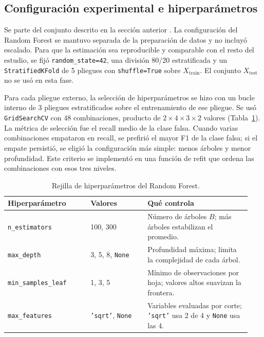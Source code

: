 \documentclass[conference]{IEEEtran}
\begin{document}
    \subsection{Configuración experimental e hiperparámetros}
    \label{sec:rf-metodologia}
    
    Se parte del conjunto descrito en la sección anterior \cite{uci_banknote}. La configuración del Random Forest se mantuvo separada de la preparación de datos y no incluyó escalado. Para que la estimación sea reproducible y comparable con el resto del estudio, se fijó \texttt{random\_state=42}, una división 80/20 estratificada y un \texttt{StratifiedKFold} de 5 pliegues con \texttt{shuffle=True} sobre $X_{\text{train}}$. El conjunto $X_{\text{test}}$ no se usó en esta fase.
    
    Para cada pliegue externo, la selección de hiperparámetros se hizo con un bucle interno de 3 pliegues estratificados sobre el entrenamiento de ese pliegue. Se usó \texttt{GridSearchCV} con 48 combinaciones, producto de $2\times4\times3\times2$ valores (Tabla~\ref{tab:rf-grid}). La métrica de selección fue el recall medio de la clase falsa. Cuando varias combinaciones empataron en recall, se prefirió el mayor F1 de la clase falsa; si el empate persistió, se eligió la configuración más simple: menos árboles y menor profundidad. Este criterio se implementó en una función de refit que ordena las combinaciones con esos tres niveles.
    
    \begin{table}[t]
    	\centering
    	\caption{Rejilla de hiperparámetros del Random Forest.}
    	\label{tab:rf-grid}
    	\begin{tabular}{@{}p{0.32\linewidth}p{0.22\linewidth}p{0.40\linewidth}@{}}
    		\toprule
    		Hiperparámetro & Valores & Qué controla \\
    		\midrule
    		\texttt{n\_estimators} & 100, 300 & Número de árboles $B$; más árboles estabilizan el promedio. \\
    		\texttt{max\_depth} & 3, 5, 8, \texttt{None} & Profundidad máxima; limita la complejidad de cada árbol. \\
    		\texttt{min\_}\allowbreak\texttt{samples\_}\allowbreak\texttt{leaf} & 1, 3, 5 & Mínimo de observaciones por hoja; valores altos suavizan la frontera. \\
    		\texttt{max\_}\allowbreak\texttt{features} & \texttt{'sqrt'}, \texttt{None} & Variables evaluadas por corte; \texttt{'sqrt'} usa 2 de 4 y \texttt{None} usa las 4. \\
    		\bottomrule
    	\end{tabular}
    \end{table}
    
\end{document}
